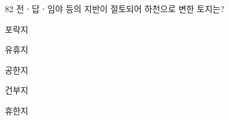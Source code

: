 \begin{question}{82}
전ㆍ답ㆍ임야 등의 지반이 절토되어 하천으로 변한 토지는?
\begin{choices}
  \item 포락지
  \item 유휴지
  \item 공한지
  \item 건부지
  \item 휴한지
\end{choices}
\end{question}
